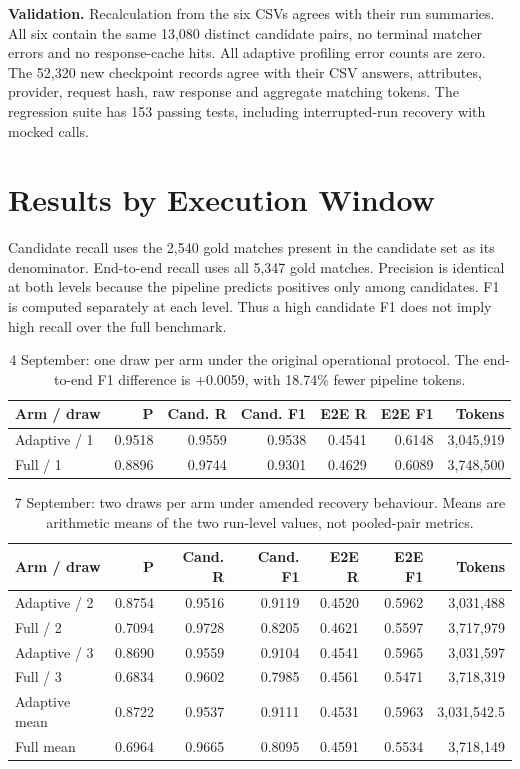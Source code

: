 \documentclass[11pt]{article}
\begin{document}
\textbf{Validation.} Recalculation from the six CSVs agrees with their run summaries.
All six contain the same 13,080 distinct candidate pairs, no terminal matcher errors
and no response-cache hits. All adaptive profiling error counts are zero. The 52,320
new checkpoint records agree with their CSV answers, attributes, provider, request
hash, raw response and aggregate matching tokens. The regression suite has 153
passing tests, including interrupted-run recovery with mocked calls.

\section{Results by Execution Window}
Candidate recall uses the 2,540 gold matches present in the candidate set as its
denominator. End-to-end recall uses all 5,347 gold matches. Precision is identical
at both levels because the pipeline predicts positives only among candidates.
F1 is computed separately at each level. Thus a high candidate F1 does not imply
high recall over the full benchmark.

\begin{table}[H]
\centering\small
\setlength{\tabcolsep}{4pt}
\begin{tabular}{lrrrrrr}
\toprule
Arm / draw & P & Cand. R & Cand. F1 & E2E R & E2E F1 & Tokens \\
\midrule
Adaptive / 1 & 0.9518 & 0.9559 & 0.9538 & 0.4541 & 0.6148 & 3,045,919 \\
Full / 1     & 0.8896 & 0.9744 & 0.9301 & 0.4629 & 0.6089 & 3,748,500 \\
\bottomrule
\end{tabular}
\caption{4 September: one draw per arm under the original operational protocol.
The end-to-end F1 difference is +0.0059, with 18.74\% fewer pipeline tokens.}
\end{table}

\begin{table}[H]
\centering\small
\setlength{\tabcolsep}{4pt}
\begin{tabular}{lrrrrrr}
\toprule
Arm / draw & P & Cand. R & Cand. F1 & E2E R & E2E F1 & Tokens \\
\midrule
Adaptive / 2 & 0.8754 & 0.9516 & 0.9119 & 0.4520 & 0.5962 & 3,031,488 \\
Full / 2     & 0.7094 & 0.9728 & 0.8205 & 0.4621 & 0.5597 & 3,717,979 \\
Adaptive / 3 & 0.8690 & 0.9559 & 0.9104 & 0.4541 & 0.5965 & 3,031,597 \\
Full / 3     & 0.6834 & 0.9602 & 0.7985 & 0.4561 & 0.5471 & 3,718,319 \\
\midrule
Adaptive mean & 0.8722 & 0.9537 & 0.9111 & 0.4531 & 0.5963 & 3,031,542.5 \\
Full mean     & 0.6964 & 0.9665 & 0.8095 & 0.4591 & 0.5534 & 3,718,149 \\
\bottomrule
\end{tabular}
\caption{7 September: two draws per arm under amended recovery behaviour.
Means are arithmetic means of the two run-level values, not pooled-pair metrics.}
\end{table}
\end{document}
